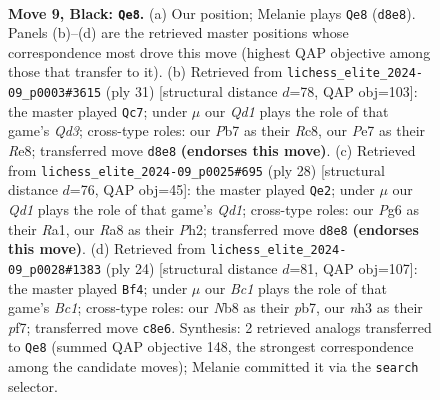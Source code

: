 \documentclass[11pt]{article}
\begin{document}
\clearpage

\begin{figure}[p]\centering
\begin{subfigure}{0.46\textwidth}\centering
\resizebox{\linewidth}{!}{%
\newchessgame
\chessboard[
  setfen={rnbq1rk1/ppp1pp1p/5bp1/8/2BPP3/B1P4N/P4PPP/R2QK2R b KQ - 6 9},
  showmover=false,
  pgfstyle=straightmove, color=movearrow, markmove={d8-e8}
]}
\caption{}
\end{subfigure}\hfill
\begin{subfigure}{0.46\textwidth}\centering
\resizebox{\linewidth}{!}{%
\newchessgame
\chessboard[
  setfen={2r1r1k1/pp2ppbp/2nq2p1/5b2/P1BP4/2P2N1P/Q4PP1/R1BR2K1 b - - 6 16},
  showmover=false,
  pgfstyle=straightmove, color=movearrow, markmove={d6-c7}
]}
\caption{}
\end{subfigure}
\\[4pt]
\begin{subfigure}{0.46\textwidth}\centering
\resizebox{\linewidth}{!}{%
\newchessgame
\chessboard[
  setfen={r2qk2r/5ppp/p3p3/2bn4/PpB5/1P6/1P3PPP/R1BQ1RK1 w kq - 1 15},
  showmover=false,
  pgfstyle=straightmove, color=movearrow, markmove={d1-e2}
]}
\caption{}
\end{subfigure}\hfill
\begin{subfigure}{0.46\textwidth}\centering
\resizebox{\linewidth}{!}{%
\newchessgame
\chessboard[
  setfen={r2qk2r/pp3ppp/4b3/2bpP3/2p5/5B2/PPP2PPP/R1BQ1RK1 w kq - 3 13},
  showmover=false,
  pgfstyle=straightmove, color=movearrow, markmove={c1-f4}
]}
\caption{}
\end{subfigure}
\caption{\textbf{Move 9, Black: \texttt{Qe8}.} (a) Our position; Melanie plays \texttt{Qe8} (\texttt{d8e8}). Panels (b)--(d) are the retrieved master positions whose correspondence most drove this move (highest QAP objective among those that transfer to it). (b) Retrieved from \texttt{lichess\_elite\_2024-09\_p0003\#3615} (ply 31) [structural distance $d$=78, QAP obj=103]: the master played \texttt{Qc7}; under $\mu$ our \emph{Qd1} plays the role of that game's \emph{Qd3}; cross-type roles: our \emph{P}b7 as their \emph{R}c8, our \emph{P}e7 as their \emph{R}e8; transferred move \texttt{d8e8} \textbf{(endorses this move)}. (c) Retrieved from \texttt{lichess\_elite\_2024-09\_p0025\#695} (ply 28) [structural distance $d$=76, QAP obj=45]: the master played \texttt{Qe2}; under $\mu$ our \emph{Qd1} plays the role of that game's \emph{Qd1}; cross-type roles: our \emph{P}g6 as their \emph{R}a1, our \emph{R}a8 as their \emph{P}h2; transferred move \texttt{d8e8} \textbf{(endorses this move)}. (d) Retrieved from \texttt{lichess\_elite\_2024-09\_p0028\#1383} (ply 24) [structural distance $d$=81, QAP obj=107]: the master played \texttt{Bf4}; under $\mu$ our \emph{Bc1} plays the role of that game's \emph{Bc1}; cross-type roles: our \emph{N}b8 as their \emph{p}b7, our \emph{n}h3 as their \emph{p}f7; transferred move \texttt{c8e6}. Synthesis: 2 retrieved analogs transferred to \texttt{Qe8} (summed QAP objective 148, the strongest correspondence among the candidate moves); Melanie committed it via the \texttt{search} selector.}
\label{fig:thought-m17}
\end{figure}
\end{document}
